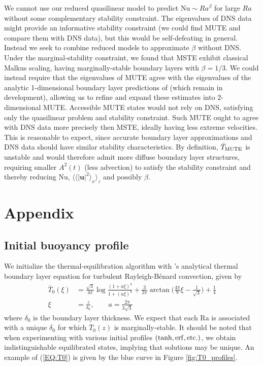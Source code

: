 \documentclass[reprint,amsmath,amssymb,aps]{revtex4-1}
\newcommand\Ra{\mathrm{Ra}}
\newcommand\Nu{\mathrm{Nu}}
\begin{document}
We cannot use our reduced quasilinear model to predict $\Nu \sim Ra^{\beta}$ for large $Ra$ without some complementary stability constraint. 
The eigenvalues of DNS data might provide an informative stability constraint (we could find MUTE and compare them with DNS data), but this would be self-defeating in general. 
Instead we seek to combine reduced models to approximate $\beta$ without DNS. Under the marginal-stability constraint, we found that MSTE exhibit classical Malkus scaling, having marginally-stable boundary layers with $\beta = 1/3$. 
We could instead require that the eigenvalues of MUTE agree with the eigenvalues of the analytic 1-dimensional boundary layer predictions of \cite{Shishkina, Zhang_20} (which remain in development), allowing us to refine and expand these estimates into 2-dimensional MUTE. 
Accessible MUTE states would not rely on DNS, satisfying only the quasilinear problem and stability constraint. 
Such MUTE ought to agree with DNS data more precisely then MSTE, ideally having less extreme velocities. 
This is reasonable to expect, since accurate boundary layer approximations and DNS data should have similar stability characteristics. 
By definition, $\bar{T}_{\rm{MUTE}}$ is unstable and would therefore admit more diffuse boundary layer structures, requiring smaller $A^2(t)$ (less advection) to satisfy the stability constraint and thereby reducing $\Nu$, $\langle \langle |\mathbf{u}|^2 \rangle_x \rangle_z$ and possibly $\beta$.

\section*{Appendix}
\subsection{Initial buoyancy profile} \label{sec:initial_profile}
We initialize the thermal-equilibration algorithm with \cite{Shishkina}'s analytical thermal boundary layer equation for turbulent Rayleigh-B\'enard convection, given by 
\begin{align}
    \bar{T}_0(\xi) &= \frac{\sqrt{3}}{4\pi} \log \frac{(1 + a\xi)^3}{1 + (a\xi)^3} + \frac{3}{2\pi} \arctan \Big( \frac{4\pi}{9}\xi - \frac{1}{\sqrt{3}} \Big) + \frac{1}{4} \nonumber \\
    \xi &= \frac{z}{\delta_0}, \qquad a = \frac{2\pi}{3\sqrt{3}}\label{EQ:T0}
\end{align}
where $\delta_0$ is the boundary layer thickness. 
We expect that each $\Ra$ is associated with a unique $\delta_0$ for which $\bar{T}_0(z)$ is marginally-stable. 
It should be noted that when experimenting with various initial profiles $(\tanh, \rm{erf}, \rm{etc.})$, we obtain indistinguishable equilibrated states, implying that solutions may be unique. 
An example of (\ref{EQ:T0}) is given by the blue curve in Figure \ref{fig:T0_profiles}.
\end{document}
